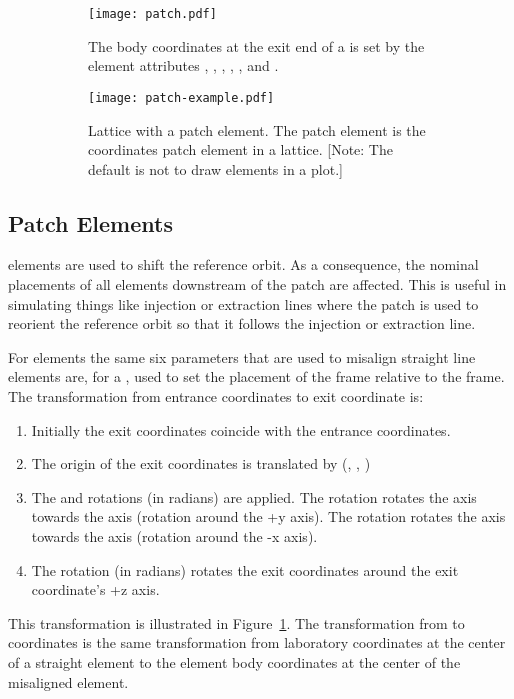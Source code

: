\documentclass{hitec}     %
\begin{document}
{\newpage

\begin{figure}[tb]
  \centering
  \begin{subfigure}[t]{0.48\textwidth}
    \texttt{[image: patch.pdf]}
    \vspace*{5pt}
    \caption{The body coordinates at the exit end of a  is set by the element attributes
, , , , , and .}
    \label{f:patch}
  \end{subfigure}
  \hfil
  \begin{subfigure}[t]{0.48\textwidth}
    \texttt{[image: patch-example.pdf]}
    \caption{Lattice with a patch element.
The patch element is the coordinates patch element in a lattice. [Note: The default is not to
draw  elements in a  plot.]}
    \label{f:patch.example}
  \end{subfigure}
  \caption{}
\end{figure}

\subsection{Patch Elements}
\label{s:patch}

 elements are used to shift the reference orbit. As a consequence, the nominal placements
of all elements downstream of the patch are affected. This is useful in simulating things like injection
or extraction lines where the patch is used to reorient the reference orbit so that it follows the 
injection or extraction line.

For  elements the same six parameters that are used to misalign straight line elements
are, for a , used to set the placement of the  frame relative to the 
frame. The transformation from entrance coordinates to exit coordinate is:
\vspace{-5 pt}
\begin{enumerate}
\item Initially the exit coordinates coincide with the entrance coordinates.
\item The origin of the exit coordinates is translated by (, , )
\item The  and  rotations (in radians) are applied. 
The  rotation rotates the  axis
towards the  axis (rotation around the +y axis). The  rotation rotates the  axis
towards the  axis (rotation around the -x axis).
\item The  rotation (in radians) rotates the exit coordinates around the exit coordinate's +z
axis.
\end{enumerate}
This transformation is illustrated in Figure~\ref{f:patch}. The transformation from 
 to  coordinates is the same transformation from laboratory coordinates at the
center of a straight element to the element body coordinates at the center of the misaligned
element.

}
\end{document}
